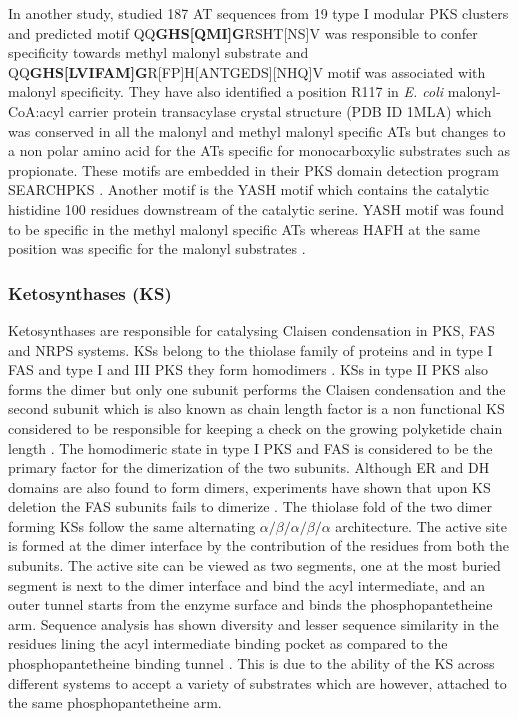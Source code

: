 			In another study, \textcite{Yadav2003} studied 187 AT sequences from 19 type I modular PKS clusters and predicted motif QQ\textbf{GHS[QMI]G}RSHT[NS]V was responsible to confer specificity towards methyl malonyl substrate and QQ\textbf{GHS[LVIFAM]G}R[FP]H[ANTGEDS][NHQ]V motif was associated with malonyl specificity. They have also identified a position R117 in \textit{E. coli} malonyl-CoA:acyl carrier protein transacylase crystal structure (PDB ID 1MLA) which was conserved in all the malonyl and methyl malonyl specific ATs but changes to a non polar amino acid for the ATs specific for monocarboxylic substrates such as propionate. These motifs are embedded in their PKS domain detection program SEARCHPKS \parencite{Yadav2003a}. Another motif is the YASH motif which contains the catalytic histidine 100 residues downstream of the catalytic serine. YASH motif was found to be specific in the methyl malonyl specific ATs whereas HAFH at the same position was specific for the malonyl substrates \parencite{Haydock1995}.  
			
			\subsubsection{Ketosynthases (KS)}
			\label{sec:KS}			
			Ketosynthases are responsible for catalysing Claisen condensation in PKS, FAS and NRPS systems. KSs belong to the thiolase family of proteins and in type I FAS and type I and III PKS they form homodimers \parencite{Austin2003, Tang2006}. KSs in type II PKS also forms the dimer but only one subunit performs the Claisen condensation and the second subunit which is also known as chain length factor is a non functional KS considered to be responsible for keeping a check on the growing polyketide chain length \parencite{Tang2003, Szu2011}. The homodimeric state in type I PKS and FAS is considered to be the primary factor for the dimerization of the two subunits. Although ER and DH domains are also found to form dimers, experiments have shown that upon KS deletion the FAS subunits fails to dimerize \parencite{Smith2007}. The thiolase fold of the two dimer forming KSs follow the same  alternating $\alpha /\beta/ \alpha/ \beta/ \alpha$ architecture. The active site is formed at the dimer interface by the contribution of the residues from both the subunits. The active site can be viewed as two segments, one at the most buried segment is next to the dimer interface and bind the acyl intermediate, and an outer tunnel starts from the enzyme surface and binds the phosphopantetheine arm. Sequence analysis has shown diversity and lesser sequence similarity in the residues lining the acyl intermediate binding pocket as compared to the phosphopantetheine binding tunnel \parencite{Olsen2001}. This is due to the ability of the KS across different systems to accept a variety of substrates which are however, attached to the same phosphopantetheine arm. 
			
